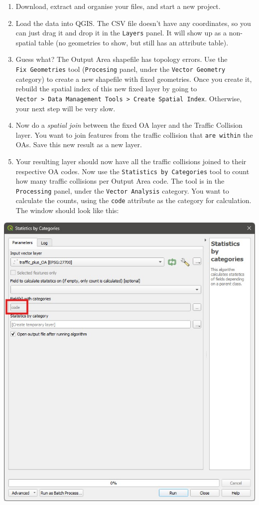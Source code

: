 \documentclass[
  letterpaper,
  DIV=11,
  numbers=noendperiod]{scrreprt}
\begin{document}
\begin{enumerate}
\def\labelenumi{\arabic{enumi})}
\item
  Download, extract and organise your files, and start a new project.
\item
  Load the data into QGIS. The CSV file doesn't have any coordinates, so
  you can just drag it and drop it in the \texttt{Layers} panel. It will
  show up as a non-spatial table (no geometries to show, but still has
  an attribute table).
\item
  Guess what? The Output Area shapefile has topology errors. Use the
  \texttt{Fix\ Geometries} tool (\texttt{Procesing} panel, under the
  \texttt{Vector\ Geometry} category) to create a new shapefile with
  fixed geometries. Once you create it, rebuild the spatial index of
  this new fixed layer by going to
  \texttt{Vector\ \textgreater{}\ Data\ Management\ Tools\ \textgreater{}\ Create\ Spatial\ Index}.
  Otherwise, your next step will be very slow.
\item
  Now do a \emph{spatial join} between the fixed OA layer and the
  Traffic Collision layer. You want to join features from the traffic
  collision that \texttt{are\ within} the OAs. Save this new result as a
  new layer.
\item
  Your resulting layer should now have all the traffic collisions joined
  to their respective OA codes. Now use the
  \texttt{Statistics\ by\ Categories} tool to count how many traffic
  collisions per Output Area code. The tool is in the
  \texttt{Processing} panel, under the \texttt{Vector\ Analysis}
  category. You want to calculate the counts, using the \texttt{code}
  attribute as the category for calculation. The window should look like
  this:
\end{enumerate}

\includegraphics{images/lab_11/lab_11_fig_6_stats_by_cats.jpg}
\end{document}
